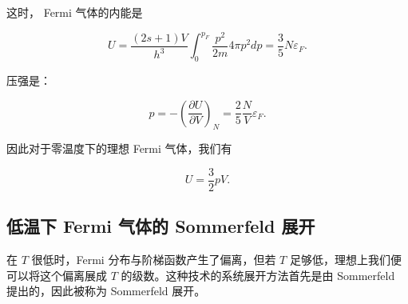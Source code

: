 这时， Fermi 气体的内能是
\begin{linenomath}\begin{equation}
    U = \frac{(2s+1)V}{h^3}\int_{0}^{p_F}\frac{p^2}{2m} 4\pi p^2 dp  = \frac{3}{5}N\varepsilon_F.
\end{equation}\end{linenomath}
压强是：
\begin{linenomath}
\begin{equation}
    p = -\left( \frac{\partial U}{\partial V} \right)_{N} = \frac{2}{5}\frac{N}{V}\varepsilon_F.
\end{equation}
\end{linenomath}
因此对于零温度下的理想 Fermi 气体，我们有
\begin{linenomath}\begin{equation}
    U = \frac32 pV.
\end{equation}\end{linenomath}
\subsection{低温下 Fermi 气体的 Sommerfeld 展开}
在 $T$ 很低时，Fermi 分布与阶梯函数产生了偏离，但若 $T$ 足够低，理想上我们便可以将这个偏离展成 $T$ 的级数。这种技术的系统展开方法首先是由 Sommerfeld 提出的，因此被称为 Sommerfeld 展开。

